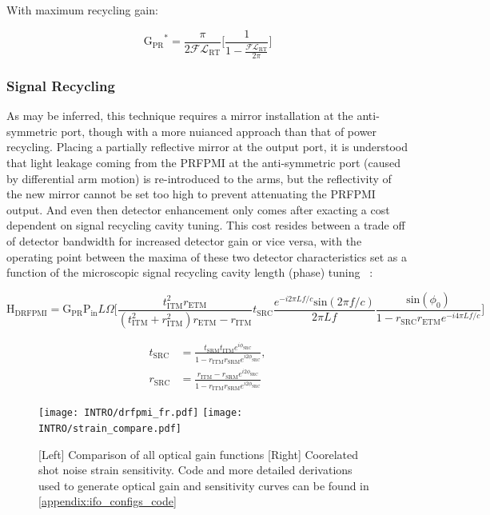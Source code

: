 \noindent With maximum recycling gain: 

\begin{equation}
    \mathrm{G_{PR}}^{*} = \frac{\pi}{2 \mathscr{F} \mathscr{L}_\mathrm{RT}} \bigg[ \frac{1}{1- \frac{ \mathscr{F} \mathscr{L}_\mathrm{RT}}{ 2 \pi}} \bigg]
\end{equation}

\subsubsection{Signal Recycling}
As may be inferred, this technique requires a mirror installation at the anti-symmetric port, though with a more nuianced approach than that of power recycling. Placing a partially reflective mirror at the output port, it is understood that light leakage coming from the PRFPMI at the anti-symmetric port (caused by differential arm motion) is re-introduced to the arms, but the reflectivity of the new mirror cannot be set too high to prevent attenuating the PRFPMI output. And even then detector enhancement only comes after exacting a cost dependent on signal recycling cavity tuning. This cost resides between a trade off of detector bandwidth for increased detector gain or vice versa, with the operating point between the maxima of these two detector characteristics set as a function of the microscopic signal recycling cavity length (phase) tuning ~\cite{Vajente:2018_unpub}:

\begin{equation}
	\mathrm{H}_\mathrm{DRFPMI} = \mathrm{G}_\mathrm{PR} \mathrm{P}_\mathrm{in} L \Omega \bigg[ \frac{ t_\mathrm{ITM}^2 r_\mathrm{ETM}}{(t_\mathrm{ITM}^2 + r_\mathrm{ITM}^2)r_\mathrm{ETM} - r_\mathrm{ITM}}  t_\mathrm{SRC} \frac{e^{-i 2 \pi L f / c} \mathrm{sin}( 2 \pi f / c)}{ 2 \pi L f } \frac{\mathrm{sin}(\phi_0)}{1- r_\mathrm{SRC}r_\mathrm{ETM} e^{-i 4 \pi L f / c}} \bigg]
\end{equation}

\begin{align}
	t_\mathrm{SRC} & = \frac{t_\mathrm{SRM} t_\mathrm{ITM} e^{i\phi_\mathrm{SRC}}}{1-r_\mathrm{ITM} r_\mathrm{SRM} e^{i2\phi_\mathrm{SRC}}}, \\
	r_\mathrm{SRC} & = \frac{r_\mathrm{ITM} - r_\mathrm{SRM} e^{i2\phi_\mathrm{SRC}}}{1-r_\mathrm{ITM} r_\mathrm{SRM} e^{i2\phi_\mathrm{SRC}}} 
\end{align}

\begin{figure}[h!]
  \begin{subcaptiongroup}
	  \texttt{[image: INTRO/drfpmi\_fr.pdf]}
 	  \texttt{[image: INTRO/strain\_compare.pdf]}
  \end{subcaptiongroup}
  \hfill
  \caption{[Left] Comparison of all optical gain functions [Right] Coorelated shot noise strain sensitivity. Code and more detailed derivations used to generate optical gain and sensitivity curves can be found in \autoref{appendix:ifo_configs_code}}
  \label{fig:drfpmi_gain_and_strain}
\end{figure}

